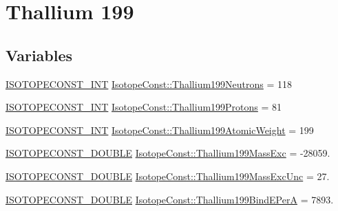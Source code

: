 \hypertarget{group___isotope_const-_thallium-_tl199}{}\section{Thallium 199}
\label{group___isotope_const-_thallium-_tl199}
\subsection*{Variables}
\begin{DoxyCompactItemize}
\item 
\mbox{\hyperlink{group___isotope_const-_macros_ga5f18360b3e99483a35c32d789e62621c}{I\+S\+O\+T\+O\+P\+E\+C\+O\+N\+S\+T\+\_\+\+I\+NT}} \mbox{\hyperlink{group___isotope_const-_thallium-_tl199_gad01951f7f10129d61e227a106e4b4d46}{Isotope\+Const\+::\+Thallium199\+Neutrons}} = 118
\item 
\mbox{\hyperlink{group___isotope_const-_macros_ga5f18360b3e99483a35c32d789e62621c}{I\+S\+O\+T\+O\+P\+E\+C\+O\+N\+S\+T\+\_\+\+I\+NT}} \mbox{\hyperlink{group___isotope_const-_thallium-_tl199_ga1e984e1e973d80a9e95a2b27ed3bb9a4}{Isotope\+Const\+::\+Thallium199\+Protons}} = 81
\item 
\mbox{\hyperlink{group___isotope_const-_macros_ga5f18360b3e99483a35c32d789e62621c}{I\+S\+O\+T\+O\+P\+E\+C\+O\+N\+S\+T\+\_\+\+I\+NT}} \mbox{\hyperlink{group___isotope_const-_thallium-_tl199_ga708b6be9154064f47ac12e89bcb0789b}{Isotope\+Const\+::\+Thallium199\+Atomic\+Weight}} = 199
\item 
\mbox{\hyperlink{group___isotope_const-_macros_ga8f45a7272ce02c0b4c65c44636ed719a}{I\+S\+O\+T\+O\+P\+E\+C\+O\+N\+S\+T\+\_\+\+D\+O\+U\+B\+LE}} \mbox{\hyperlink{group___isotope_const-_thallium-_tl199_ga53ec409c5145a21e5abb6d6cc4948608}{Isotope\+Const\+::\+Thallium199\+Mass\+Exc}} = -\/28059.
\item 
\mbox{\hyperlink{group___isotope_const-_macros_ga8f45a7272ce02c0b4c65c44636ed719a}{I\+S\+O\+T\+O\+P\+E\+C\+O\+N\+S\+T\+\_\+\+D\+O\+U\+B\+LE}} \mbox{\hyperlink{group___isotope_const-_thallium-_tl199_ga8fdd274c8c6d5f8411f91e9ddaed81db}{Isotope\+Const\+::\+Thallium199\+Mass\+Exc\+Unc}} = 27.
\item 
\mbox{\hyperlink{group___isotope_const-_macros_ga8f45a7272ce02c0b4c65c44636ed719a}{I\+S\+O\+T\+O\+P\+E\+C\+O\+N\+S\+T\+\_\+\+D\+O\+U\+B\+LE}} \mbox{\hyperlink{group___isotope_const-_thallium-_tl199_ga21db591f76cdefa1cb1bcf8b00ccc900}{Isotope\+Const\+::\+Thallium199\+Bind\+E\+PerA}} = 7893.
\item 

\end{DoxyCompactItemize}
